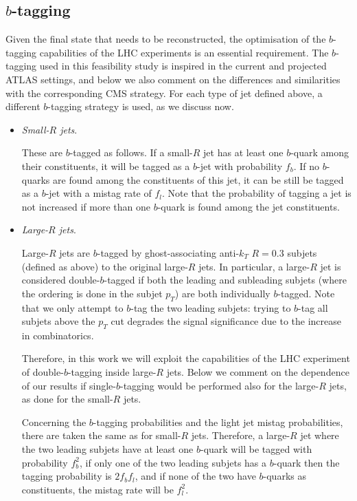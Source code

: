 \subsection{$b$-tagging}

Given the final state that needs to be reconstructed, the
optimisation of the $b$-tagging capabilities of the
LHC experiments is an essential requirement.
%
The $b$-tagging used in this feasibility study is inspired
in the current and projected ATLAS settings, and below
we also comment on the differences and similarities with the
corresponding CMS strategy.
%
For each type of jet defined above, a different
$b$-tagging strategy is used, as we discuss now.

\begin{itemize}

\item {\it Small-$R$ jets}.

  These are $b$-tagged as follows.
  If a small-$R$ jet has at least one $b$-quark among their constituents,
  it will be tagged as a $b$-jet with probability $f_b$.
  If no $b$-quarks are found among the constituents
  of this jet, it can be still be tagged as a $b$-jet with
  a mistag rate of $f_l$.
  Note that the probability of tagging a jet is not increased
  if more than one $b$-quark is found among the jet constituents.

  \item {\it Large-$R$ jets}.

    Large-$R$ jets are $b$-tagged by ghost-associating anti-$k_T$ $R=0.3$
    subjets (defined as above) to the original large-$R$ jets.
    In particular,
    a large-$R$ jet is considered  double-$b$-tagged if both
    the leading and subleading subjets (where the ordering
    is done in the subjet $p_T$) are both individually $b$-tagged.
    Note that we only attempt to $b$-tag the two leading subjets:
    trying to $b$-tag all subjets above the $p_T$ cut degrades
    the signal significance due to the increase in combinatorics.

    Therefore, in this work we will exploit the capabilities of
    the LHC experiment of double-$b$-tagging inside large-$R$ jets.
    Below we comment on the dependence of our results if single-$b$-tagging
    would be performed also for the large-$R$ jets, as done
    for the small-$R$ jets.

    Concerning the $b$-tagging probabilities and the
    light jet mistag probabilities, there are taken
    the same as for small-$R$ jets.
    Therefore, a large-$R$ jet where the two leading
    subjets have at least one $b$-quark will be tagged
    with probability $f_b^2$, if only one of the two leading
    subjets has a $b$-quark then the tagging probability is
    $2f_bf_l$, and if none of the two have $b$-quarks
    as constituents, the mistag rate will be
    $f_l^2$.


\end{itemize}

